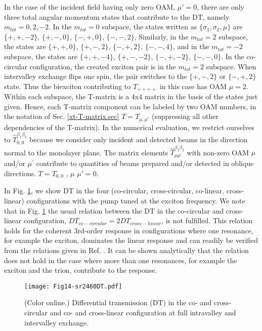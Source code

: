 \documentclass[aps,prb,superscriptaddress,letterpaper,amsmath,amssymb,twocolumn,preprintnumbers]{revtex4}
\begin{document}
In the case of the incident field having only zero OAM, $\mu' = 0$, there are only three total angular momentum states that contribute to the DT,
namely $m_{tot} = 0, 2, -2$.
In the  $m_{tot} = 0$ subspace, the states
written as
$\{ \sigma_1 ,  \sigma_2, \mu \}$
are
$\{ +, +, -2 \}$,
$\{ +, -, 0 \}$,
$\{ -, +, 0 \}$,
$\{ -, -, 2 \}$,
Similarly, in the $m_{tot} = 2$ subspace, the states are
$\{ +, +, 0 \}$,
$\{ +, -, 2 \}$,
$\{ -, +, 2 \}$,
$\{ -, -, 4 \}$,
and in the $m_{tot} = -2$ subspace, the states are
$\{ +, +, -4 \}$,
$\{ +, -, -2 \}$,
$\{ -, +, -2 \}$,
$\{ -, -, 0 \}$.
In the co-circular configuration, the created exciton pair is in the $m_{tot} = 2$ subspace. When intervalley exchange flips one spin, the pair switches to the $\{ +, -, 2 \}$ or $\{ -, +, 2 \}$ state. Thus the biexciton contributing to $T_{++++}$ in this case has OAM $\mu = 2$.
Within each subspace, the T-matrix is a 4x4 matrix in the basis of the states just given. Hence, each T-matrix component can be labeled by two OAM numbers,
in the notation of Sec. \ref{xt-T-matrix.sec}
$T=T_{ \mu, \mu' }$ (suppressing all other dependencies of the T-matrix).
In the numerical evaluation, we restrict ourselves to $\hat{T}^{\beta_1 \beta_2}_{0, 0}$ because we consider only incident and detected beams in the direction normal to the monolayer plane. The matrix elements $\hat{T}^{\beta_1 \beta_2}_{\mu \mu^{\prime}}$ with non-zero OAM $\mu$ and/or $\mu^{\prime}$ contribute to quantities of beams prepared and/or detected in oblique directions.
$T=T_{ 0, 0}$ ,
%
$\mu$
$\mu' = 0 $.




In Fig. \ref{fig:sr2461DT}, we show DT in the four (co-circular, cross-circular, co-linear, cross-linear) configurations with the pump tuned at the exciton frequency. We note that in
Fig. \ref{fig:sr2461DT}  the usual relation between the DT in the co-circular and cross-linear configuration,
$DT_{co-circular} = 2 DT_{cross-linear}$, is not fulfilled. This relation holds for the coherent 3rd-order response in configurations where one resonance, for example the exciton,  dominates the linear response and can readily be verified from the relations given in Ref. . It can be shown analytically that the relation does not hold in the case where more than one resonances, for example
 the exciton and the trion, contribute to the response.






\begin{figure}
	\centering
	\texttt{[image: Fig14-sr2460DT.pdf]}

	\caption{
		(Color online.)
		Differential transmission (DT) in the co- and cross-circular and co- and cross-linear configuration at full intravalley and intervalley exchange.
 }	
	\label{fig:sr2461DT}
\end{figure}
\end{document}
